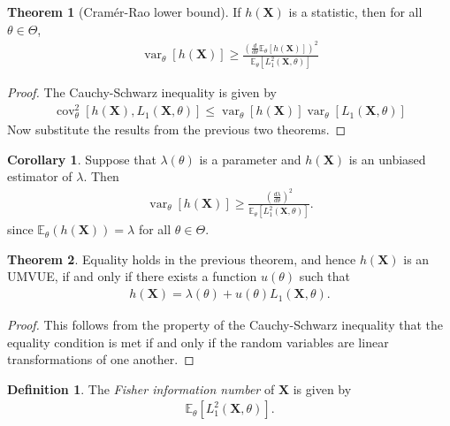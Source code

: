 \documentclass[a4paper,12pt]{article}
\theoremstyle{definition}
\newtheorem{theorem}{Theorem}[section]
\newtheorem{corollary}{Corollary}[theorem]
\theoremstyle{definition}
\theoremstyle{definition}
\newtheorem{definition}{Definition}[section]
\newcommand{\bs}{\boldsymbol}
\newcommand{\var}{\operatorname{var}}
\newcommand{\cov}{\operatorname{cov}}
\begin{document}
    \begin{theorem}[Cram\'er-Rao lower bound]
        If $h(\bs{X})$ is a statistic, then for all $\theta \in \Theta$,
        \begin{align*}
            \var_\theta[h(\bs{X})] \geq \frac{\left( \frac{d}{d\theta} \mathbb{E}_\theta[h(\bs{X})] \right)^2}{\mathbb{E}_\theta \left[ L_1^2(\bs{X}, \theta) \right]}
        \end{align*}
        \begin{proof}
            The Cauchy-Schwarz inequality is given by
            \begin{align*}
                \cov_\theta^2[h(\bs{X}), L_1(\bs{X}, \theta)] \leq \var_\theta[h(\bs{X})] \var_\theta[L_1(\bs{X}, \theta)]
            \end{align*}
            Now substitute the results from the previous two theorems.
        \end{proof}
        \begin{corollary}
            Suppose that $\lambda(\theta)$ is a parameter and $h(\bs{X})$ is an unbiased estimator of $\lambda$. Then
            \begin{align*}
                \var_\theta[h(\bs{X})] \geq \frac{\left( \frac{d\lambda}{d\theta} \right)^2}{\mathbb{E}_\theta \left[ L_1^2(\bs{X}, \theta) \right]}.
            \end{align*}
            since $\mathbb{E}_\theta(h(\bs{X})) = \lambda$ for all $\theta \in \Theta$.
        \end{corollary}
    \end{theorem}
    \begin{theorem}
        Equality holds in the previous theorem, and hence $h(\bs{X})$ is an UMVUE, if and only if there exists a function $u(\theta)$ such that
        \begin{align*}
            h(\bs{X}) = \lambda(\theta) + u(\theta) L_1 (\bs{X}, \theta).
        \end{align*}
        \begin{proof}
            This follows from the property of the Cauchy-Schwarz inequality that the equality condition is met if and only if the random variables are linear transformations of one another.
        \end{proof}
    \end{theorem}
    \begin{definition}
        The \textit{Fisher information number} of $\bs{X}$ is given by
        \begin{align*}
            \mathbb{E}_\theta \left[ L_1^2(\bs{X}, \theta) \right].
        \end{align*}
    \end{definition}
\end{document}
